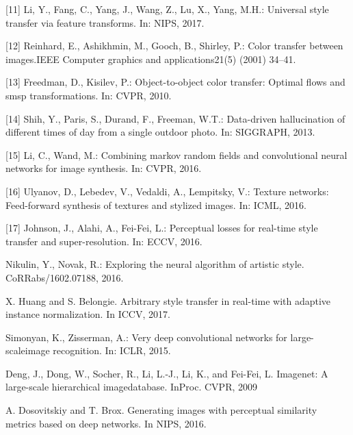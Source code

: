 \begin{thebibliography}{9}
[11] Li, Y., Fang, C., Yang, J., Wang, Z., Lu, X., Yang, M.H.:  Universal style transfer via feature transforms.  In: NIPS, 2017. 

[12] Reinhard, E., Ashikhmin, M., Gooch, B., Shirley, P.: Color transfer between images.IEEE Computer graphics and applications21(5) (2001) 34–41.

[13] Freedman, D., Kisilev, P.:  Object-to-object color transfer: Optimal flows and smsp transformations.  In: CVPR, 2010. 

[14] Shih,  Y.,  Paris,  S.,  Durand,  F.,  Freeman,  W.T.:   Data-driven  hallucination  of different times of day from a single outdoor photo.  In: SIGGRAPH, 2013.  

[15] Li,  C.,  Wand,  M.:   Combining  markov  random  fields  and  convolutional  neural networks for image synthesis.  In: CVPR, 2016. 

[16] Ulyanov, D., Lebedev, V., Vedaldi, A., Lempitsky, V.:  Texture networks: Feed-forward synthesis of textures and stylized images.  In: ICML, 2016.

[17] Johnson, J., Alahi, A., Fei-Fei, L.:  Perceptual losses for real-time style transfer and super-resolution.  In: ECCV, 2016.

Nikulin,  Y.,  Novak,  R.:  Exploring  the  neural  algorithm  of  artistic  style.  CoRRabs/1602.07188, 2016.

X. Huang and S. Belongie. Arbitrary style transfer in real-time with adaptive instance normalization. In
ICCV, 2017.

Simonyan, K., Zisserman, A.:  Very deep convolutional networks for large-scaleimage recognition.  In: ICLR, 2015.

Deng, J., Dong, W., Socher, R., Li, L.-J., Li, K., and Fei-Fei, L.  Imagenet:  A large-scale hierarchical imagedatabase.  InProc. CVPR, 2009

A. Dosovitskiy and T. Brox. Generating images with perceptual similarity metrics based on deep networks.
In NIPS, 2016.

\end{thebibliography}